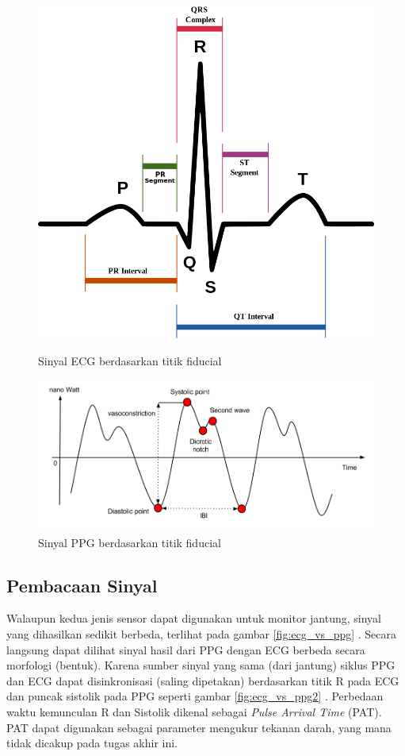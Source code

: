 \begin{figure}[h!]
    \centering
    \includegraphics[scale=0.2]{images/ecg_points.png}
    \caption{Sinyal ECG berdasarkan titik fiducial}
    \label{fig:ecg_points}
	\includegraphics[scale=0.3]{images/PPG2.png}
    \caption{Sinyal PPG berdasarkan titik fiducial}
    \label{fig:ppg_points}
\end{figure}


\subsection{Pembacaan Sinyal}
Walaupun kedua jenis sensor dapat digunakan untuk monitor jantung, sinyal yang dihasilkan sedikit berbeda, terlihat pada gambar \ref{fig:ecg_vs_ppg} \cite{ppg_vs_ecg}. Secara langsung dapat dilihat sinyal hasil dari PPG dengan ECG berbeda secara morfologi (bentuk). Karena sumber sinyal yang sama (dari jantung) siklus PPG dan ECG dapat disinkronisasi (saling dipetakan) berdasarkan titik R pada ECG dan puncak sistolik pada PPG seperti gambar \ref{fig:ecg_vs_ppg2} \cite{ecg_syncro}. Perbedaan waktu kemunculan R dan Sistolik dikenal sebagai \textit{Pulse Arrival Time} (PAT). PAT dapat digunakan sebagai parameter mengukur tekanan darah, yang mana tidak dicakup pada tugas akhir ini.

